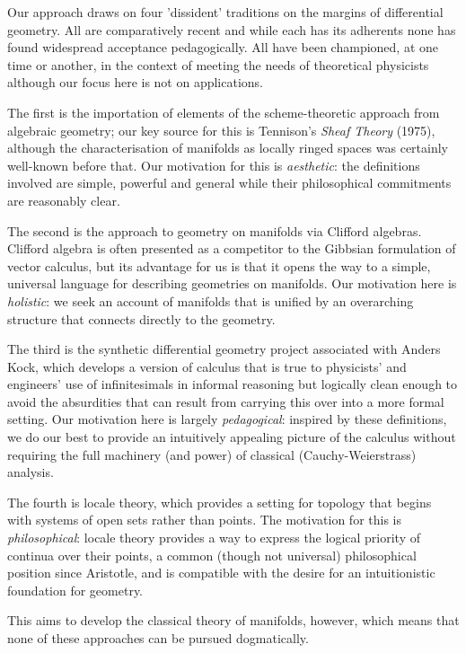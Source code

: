 \documentclass[oneside,english]{amsbook}
\numberwithin{section}{chapter}
\theoremstyle{plain}
\theoremstyle{definition}
\begin{document}
Our approach draws on four 'dissident' traditions on the margins of differential geometry. All are comparatively recent and while each has its adherents none has found widespread acceptance pedagogically. All have been championed, at one time or another, in the context of meeting the needs of theoretical physicists although our focus here is not on applications.

The first is the importation of elements of the scheme-theoretic approach from algebraic geometry; our key source for this is Tennison's \emph{Sheaf Theory} (1975), although the characterisation of manifolds as locally ringed spaces was certainly well-known before that. Our motivation for this is \emph{aesthetic}: the definitions involved are simple, powerful and general while their philosophical commitments are reasonably clear.

The second is the approach to geometry on manifolds via Clifford algebras. Clifford algebra is often presented as a competitor to the Gibbsian formulation of vector calculus, but its advantage for us is that it opens the way to a simple, universal language for describing geometries on manifolds. Our motivation here is \emph{holistic}: we seek an account of manifolds that is unified by an overarching structure that connects directly to the geometry.

The third is the synthetic differential geometry project associated with Anders Kock, which develops a version of calculus that is true to physicists' and engineers' use of infinitesimals in informal reasoning but logically clean enough to avoid the absurdities that can result from carrying this over into a more formal setting. Our motivation here is largely \emph{pedagogical}: inspired by these definitions, we do our best to provide an intuitively appealing picture of the calculus without requiring the full machinery (and power) of classical (Cauchy-Weierstrass) analysis.

The fourth is locale theory, which provides a setting for topology that begins with systems of open sets rather than points. The motivation for this is \emph{philosophical}: locale theory provides a way to express the logical priority of continua over their points, a common (though not universal) philosophical position since Aristotle, and is compatible with the desire for an intuitionistic foundation for geometry. 

This aims to develop the classical theory of manifolds, however, which means that none of these approaches can be pursued dogmatically. 
\end{document}
